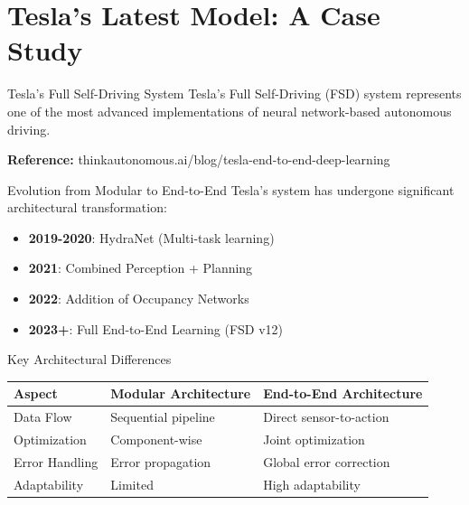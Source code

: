 \documentclass[aspectratio=169]{beamer}
\begin{document}
\section{Tesla's Latest Model: A Case Study}

\begin{frame}{Tesla's Full Self-Driving System}
    Tesla's Full Self-Driving (FSD) system represents one of the most advanced implementations of neural network-based autonomous driving.
    
    \vspace{0.5cm}
    \begin{center}
        \textbf{Reference:} thinkautonomous.ai/blog/tesla-end-to-end-deep-learning
    \end{center}
\end{frame}

\begin{frame}{Evolution from Modular to End-to-End}
    Tesla's system has undergone significant architectural transformation:
    
    \begin{itemize}
        \item \textbf{2019-2020}: HydraNet (Multi-task learning)
        \item \textbf{2021}: Combined Perception + Planning
        \item \textbf{2022}: Addition of Occupancy Networks
        \item \textbf{2023+}: Full End-to-End Learning (FSD v12)
    \end{itemize}
\end{frame}

\begin{frame}{Key Architectural Differences}
    \begin{table}[h]
        \centering
        \small
        \begin{tabular}{@{}lll@{}}
            \toprule
            \textbf{Aspect} & \textbf{Modular Architecture} & \textbf{End-to-End Architecture} \\
            \midrule
            Data Flow & Sequential pipeline & Direct sensor-to-action \\
            Optimization & Component-wise & Joint optimization \\
            Error Handling & Error propagation & Global error correction \\
            Adaptability & Limited & High adaptability \\
            \bottomrule
        \end{tabular}
    \end{table}
\end{frame}
\end{document}
